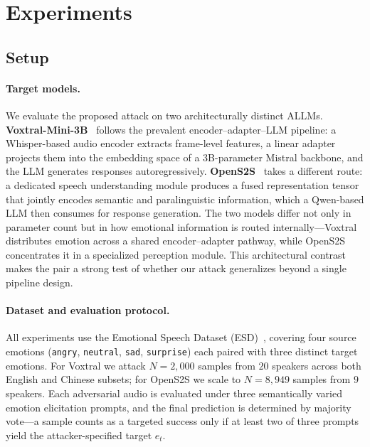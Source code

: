 
\section{Experiments}
\label{sec:experiments}

\subsection{Setup}
\label{sec:exp_setup}

\paragraph{Target models.}
We evaluate the proposed attack on two architecturally distinct ALLMs.
\textbf{Voxtral-Mini-3B}~\cite{voxtral} follows the prevalent encoder--adapter--LLM pipeline: a Whisper-based audio encoder extracts frame-level features, a linear adapter projects them into the embedding space of a 3B-parameter Mistral backbone, and the LLM generates responses autoregressively.
\textbf{OpenS2S}~\cite{opens2s} takes a different route: a dedicated speech understanding module produces a fused representation tensor that jointly encodes semantic and paralinguistic information, which a Qwen-based LLM then consumes for response generation.
The two models differ not only in parameter count but in how emotional information is routed internally---Voxtral distributes emotion across a shared encoder--adapter pathway, while OpenS2S concentrates it in a specialized perception module.
This architectural contrast makes the pair a strong test of whether our attack generalizes beyond a single pipeline design.

\paragraph{Dataset and evaluation protocol.}
All experiments use the Emotional Speech Dataset (ESD)~\cite{esd}, covering four source emotions (\texttt{angry}, \texttt{neutral}, \texttt{sad}, \texttt{surprise}) each paired with three distinct target emotions.
For Voxtral we attack $N = 2{,}000$ samples from $20$ speakers across both English and Chinese subsets; for OpenS2S we scale to $N = 8{,}949$ samples from $9$ speakers.
Each adversarial audio is evaluated under three semantically varied emotion elicitation prompts, and the final prediction is determined by majority vote---a sample counts as a targeted success only if at least two of three prompts yield the attacker-specified target $e_t$.

